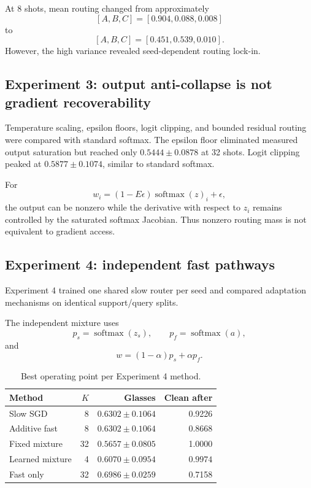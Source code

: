 \documentclass[10pt]{article}
\begin{document}
At 8 shots, mean routing changed from approximately
\[
[A,B,C]=[0.904,0.088,0.008]
\]
to
\[
[A,B,C]=[0.451,0.539,0.010].
\]
However, the high variance revealed seed-dependent routing lock-in.

\subsection{Experiment 3: output anti-collapse is not gradient recoverability}

Temperature scaling, epsilon floors, logit clipping, and bounded residual routing were compared with standard softmax. The epsilon floor eliminated measured output saturation but reached only $0.5444 \pm 0.0878$ at 32 shots. Logit clipping peaked at $0.5877 \pm 0.1074$, similar to standard softmax.

For
\[
w_i=(1-E\epsilon)\operatorname{softmax}(z)_i+\epsilon,
\]
the output can be nonzero while the derivative with respect to $z_i$ remains controlled by the saturated softmax Jacobian. Thus nonzero routing mass is not equivalent to gradient access.

\subsection{Experiment 4: independent fast pathways}

Experiment 4 trained one shared slow router per seed and compared adaptation mechanisms on identical support/query splits.

The independent mixture uses
\[
p_s=\operatorname{softmax}(z_s), \qquad
p_f=\operatorname{softmax}(a),
\]
and
\[
w=(1-\alpha)p_s+\alpha p_f.
\]

\begin{table}[h]
\centering
\caption{Best operating point per Experiment 4 method.}
\begin{tabular}{lrrr}
\toprule
Method & $K$ & Glasses & Clean after \\
\midrule
Slow SGD & 8 & $0.6302 \pm 0.1064$ & 0.9226 \\
Additive fast & 8 & $0.6302 \pm 0.1064$ & 0.8668 \\
Fixed mixture & 32 & $0.5657 \pm 0.0805$ & 1.0000 \\
Learned mixture & 4 & $0.6070 \pm 0.0954$ & $\mathbf{0.9974}$ \\
Fast only & 32 & $\mathbf{0.6986 \pm 0.0259}$ & 0.7158 \\
\bottomrule
\end{tabular}
\end{table}
\end{document}
